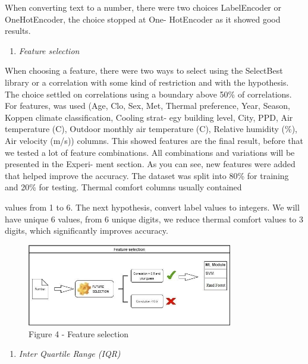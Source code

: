 When converting text to a number, there were two choices LabelEncoder or
OneHotEncoder, the choice stopped at One- HotEncoder as it showed good
results.

\begin{enumerate}
\def\labelenumi{\Alph{enumi}.}
\setcounter{enumi}{3}
\item
  \emph{Feature selection}
\end{enumerate}

When choosing a feature, there were two ways to select using the
SelectBest library or a correlation with some kind of restriction and
with the hypothesis. The choice settled on correlations using a boundary
above 50\% of correlations. For features, was used (Age, Clo, Sex, Met,
Thermal preference, Year, Season, Koppen climate classification, Cooling
strat- egy building level, City, PPD, Air temperature (C), Outdoor
monthly air temperature (C), Relative humidity (\%), Air velocity (m/s))
columns. This showed features are the final result, before that we
tested a lot of feature combinations. All combinations and variations
will be presented in the Experi- ment section. As you can see, new
features were added that helped improve the accuracy. The dataset was
split into 80\% for training and 20\% for testing. Thermal comfort
columns usually contained

values from 1 to 6. The next hypothesis, convert label values to
integers. We will have unique 6 values, from 6 unique digits, we reduce
thermal comfort values to 3 digits, which significantly improves
accuracy.

\begin{figure}[H]
	\centering
	\includegraphics[width=0.8\textwidth]{media/ict/image20}
	\caption*{Figure 4 - Feature selection}
\end{figure}

\begin{enumerate}
\def\labelenumi{\Alph{enumi}.}
\setcounter{enumi}{4}
\item
  \emph{Inter Quartile Range (IQR)}
\end{enumerate}

